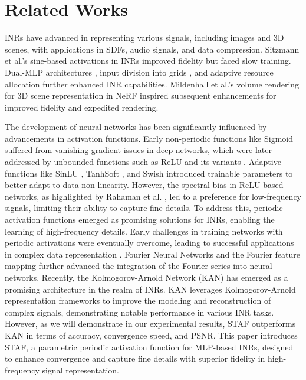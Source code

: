 \section{Related Works}
\label{sec:relatedworks}


INRs have advanced in representing various signals, including images and 3D scenes, with applications in SDFs, audio signals, and data compression. Sitzmann et al.'s sine-based activations in INRs \citep{Siren} improved fidelity but faced slow training. Dual-MLP architectures \citep{mehta2021modulated}, input division into grids \citep{aftab2022multi,kadarvish2021ensemble}, and adaptive resource allocation \citep{acorn,saragadam2022miner} further enhanced INR capabilities. Mildenhall et al.'s volume rendering for 3D scene representation in NeRF \citep{mildenhall2020nerf} inspired subsequent enhancements \citep{chen2024far, barron2023zip, kazerouni2024incode,xu2023jacobinerf, lin2024fastsr, li2025nerf, uy2024nerf, reiser2021kilonerf} for improved fidelity and expedited rendering.

The development of neural networks has been significantly influenced by advancements in activation functions. Early non-periodic functions like Sigmoid suffered from vanishing gradient issues in deep networks, which were later addressed by unbounded functions such as ReLU \citep{nair2010rectified} and its variants \citep{maas2013rectifier, elfwing2018sigmoid, hendrycks2016gaussian}. Adaptive functions like SinLU \citep{paul2022sinlu}, TanhSoft \citep{biswas2021tanhsoft}, and Swish \citep{ramachandran2017searching} introduced trainable parameters to better adapt to data non-linearity. However, the spectral bias in ReLU-based networks, as highlighted by Rahaman et al. \citep{rahaman2019spectral}, led to a preference for low-frequency signals, limiting their ability to capture fine details. To address this, periodic activation functions emerged as promising solutions for INRs, enabling the learning of high-frequency details. Early challenges in training networks with periodic activations \citep{lapedes1987nonlinear, parascandolo2016taming} were eventually overcome, leading to successful applications in complex data representation \citep{Siren, mehta2021modulated}. Fourier Neural Networks \citep{gallant1988there} and the Fourier feature mapping \citep{tancik2020fourier} further advanced the integration of the Fourier series into neural networks. Recently, the Kolmogorov-Arnold Network (KAN) \citep{liu2024kan, ss2024chebyshev} has emerged as a promising architecture in the realm of INRs. KAN leverages Kolmogorov-Arnold representation frameworks to improve the modeling and reconstruction of complex signals, demonstrating notable performance in various INR tasks. However, as we will demonstrate in our experimental results, STAF outperforms KAN in terms of accuracy, convergence speed, and PSNR. This paper introduces STAF, a parametric periodic activation function for MLP-based INRs, designed to enhance convergence and capture fine details with superior fidelity in high-frequency signal representation.

